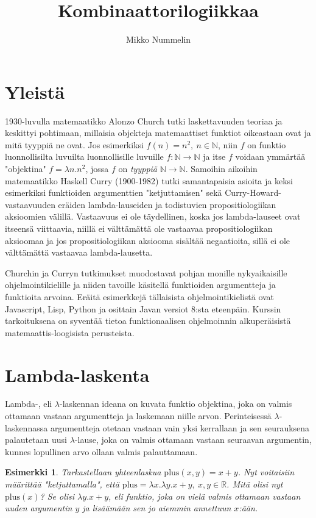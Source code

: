 \documentclass[a4paper,12pt]{amsart}
\begin{document}
\title{Kombinaattorilogiikkaa}
\author{Mikko Nummelin}
\maketitle
\tableofcontents
\newtheorem{esimerkki}{Esimerkki}
\newtheorem{lause}{Lause}
\section{Yleistä}
1930-luvulla matemaatikko Alonzo Church tutki laskettavuuden teoriaa ja keskittyi pohtimaan, millaisia objekteja matemaattiset funktiot oikeastaan ovat ja mitä tyyppiä ne ovat. Jos esimerkiksi $f(n)=n^2,\ n\in\mathbb{N}$, niin $f$ on funktio luonnollisilta luvuilta luonnollisille luvuille $f:\mathbb{N}\to\mathbb{N}$ ja itse $f$ voidaan ymmärtää "objektina" $f=\lambda n.n^2$, jossa $f$ on \emph{tyyppiä} $\mathbb{N}\to\mathbb{N}$. Samoihin aikoihin matemaatikko Haskell Curry (1900-1982) tutki samantapaisia asioita ja keksi esimerkiksi funktioiden argumenttien "ketjuttamisen" sekä Curry-Howard-vastaavuuden eräiden lambda-lauseiden ja todistuvien propositiologiikan aksioomien välillä. Vastaavuus ei ole täydellinen, koska jos lambda-lauseet ovat itseensä viittaavia, niillä ei välttämättä ole vastaavaa propositiologiikan aksioomaa ja jos propositiologiikan aksiooma sisältää negaatioita, sillä ei ole välttämättä vastaavaa lambda-lausetta.

Churchin ja Curryn tutkimukset muodostavat pohjan monille nykyaikaisille ohjelmointikielille ja niiden tavoille käsitellä funktioiden argumentteja ja funktioita arvoina. Eräitä esimerkkejä tällaisista ohjelmointikielistä ovat Javascript, Lisp, Python ja osittain Javan versiot 8:sta eteenpäin. Kurssin tarkoituksena on syventää tietoa funktionaalisen ohjelmoinnin alkuperäisistä matemaattis-loogisista perusteista.
\section{Lambda-laskenta}
Lambda-, eli $\lambda$-laskennan ideana on kuvata funktio objektina, joka on valmis ottamaan vastaan argumentteja ja laskemaan niille arvon. Perinteisessä $\lambda$-laskennassa argumentteja otetaan vastaan vain yksi kerrallaan ja sen seurauksena palautetaan uusi $\lambda$-lause, joka on valmis ottamaan vastaan seuraavan argumentin, kunnes lopullinen arvo ollaan valmis palauttamaan.
\begin{esimerkki}
Tarkastellaan yhteenlaskua $\mathrm{plus}(x,y)=x+y$. Nyt voitaisiin määrittää "ketjuttamalla", että $\mathrm{plus}=\lambda x.\lambda y.x+y,\ x,y\in\mathbb{R}$. Mitä olisi nyt $\mathrm{plus}(x)$? Se olisi $\lambda y.x+y$, eli funktio, joka on vielä valmis ottamaan vastaan uuden argumentin $y$ ja lisäämään sen jo aiemmin annettuun $x$:ään.
\end{esimerkki}
\end{document}
